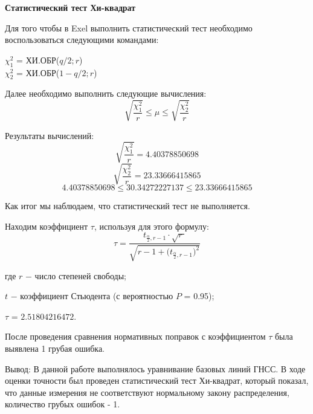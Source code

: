 \documentclass[a4paper]{article}
\begin{document}
\begin{newpage}
\begin{center}
    \Large{{\textbf{Статистический тест Хи-квадрат}}}
\end{center}
\par Для того чтобы в Exel выполнить статистический тест необходимо воспользоваться следующими командами: 
\begin{center}
    $\chi^{2}_1$ = ХИ.ОБР($q/2;r$)\\
    $\chi^{2}_2$ = ХИ.ОБР($1-q/2;r$)
\end{center}
\par Далее необходимо выполнить следующие вычисления:
$$\sqrt{\frac{\chi^{2}_1}{r}}\leq\mu\leq\sqrt{\frac{\chi^{2}_2}{r}}$$
\par Результаты вычислений:
$$\sqrt{\frac{\chi^{2}_1}{r}} = 4.40378850698$$
$$\sqrt{\frac{\chi^{2}_2}{r}} = 23.33666415865$$
$$ 4.40378850698\leq30.34272227137\leq23.33666415865 $$
\par Как итог мы наблюдаем, что статистический тест не выполняется. 
\par Находим коэффициент $\tau$, используя для этого формулу:
\begin{equation}
    \tau = \frac{t_{\frac{\alpha}{2}, r-1}\cdot\sqrt{r \ }}{\sqrt{r-1+\Big(t_{\frac{\alpha}{2}, r-1}\Big)^2}}
\end{equation}
\par где $r$ $-$ число степеней свободы;
\par $t$ $-$ коэффициент Стьюдента (с вероятностью $P$ = 0.95);
\par $\tau$ = $2.51804216472$.
\end{newpage}
\begin{newpage}
\par После проведения сравнения нормативных поправок с коэффициентом $\tau$ была выявлена 1 грубая ошибка.
\par Вывод: В данной работе выполнялось уравнивание базовых линий ГНСС. В ходе оценки точности был проведен статистический тест Хи-квадрат, который показал, что данные измерения не соответствуют нормальному закону распределения, количество грубых ошибок - 1.
\end{newpage}
\end{document}
